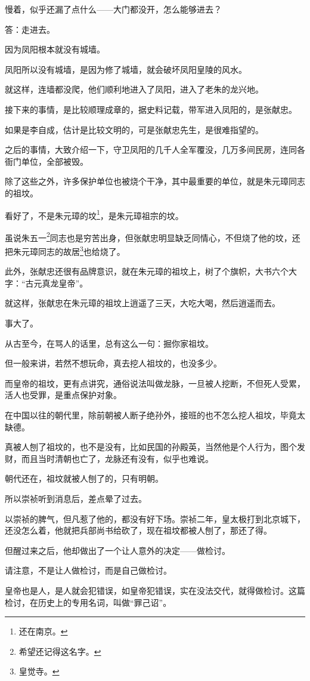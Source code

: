\begin{multicols}{\theparacolNo}
慢着，似乎还漏了点什么——大门都没开，怎么能够进去？

答：走进去。

因为凤阳根本就没有城墙。

凤阳所以没有城墙，是因为修了城墙，就会破坏凤阳皇陵的风水。

就这样，连墙都没爬，他们顺利地进入了凤阳，进入了老朱的龙兴地。

接下来的事情，是比较顺理成章的，据史料记载，带军进入凤阳的，是张献忠。

如果是李自成，估计是比较文明的，可是张献忠先生，是很难指望的。

之后的事情，大致介绍一下，守卫凤阳的几千人全军覆没，几万多间民房，连同各衙门单位，全部被毁。

除了这些之外，许多保护单位也被烧个干净，其中最重要的单位，就是朱元璋同志的祖坟。

看好了，不是朱元璋的坟\footnote{还在南京。}，是朱元璋祖宗的坟。

虽说朱五一\footnote{希望还记得这名字。}同志也是穷苦出身，但张献忠明显缺乏同情心，不但烧了他的坟，还把朱元璋同志的故居\footnote{皇觉寺。}也给烧了。

此外，张献忠还很有品牌意识，就在朱元璋的祖坟上，树了个旗帜，大书六个大字：“古元真龙皇帝”。

就这样，张献忠在朱元璋的祖坟上逍遥了三天，大吃大喝，然后逍遥而去。

事大了。

从古至今，在骂人的话里，总有这么一句：掘你家祖坟。

但一般来讲，若然不想玩命，真去挖人祖坟的，也没多少。

而皇帝的祖坟，更有点讲究，通俗说法叫做龙脉，一旦被人挖断，不但死人受累，活人也受罪，是重点保护对象。

在中国以往的朝代里，除前朝被人断子绝孙外，接班的也不怎么挖人祖坟，毕竟太缺德。

真被人刨了祖坟的，也不是没有，比如民国的孙殿英，当然他是个人行为，图个发财，而且当时清朝也亡了，龙脉还有没有，似乎也难说。

朝代还在，祖坟就被人刨了的，只有明朝。

所以崇祯听到消息后，差点晕了过去。

以崇祯的脾气，但凡惹了他的，都没有好下场。崇祯二年，皇太极打到北京城下，还没怎么着，他就把兵部尚书给砍了，现在祖坟都被人刨了，那还了得。

但醒过来之后，他却做出了一个让人意外的决定——做检讨。

请注意，不是让人做检讨，而是自己做检讨。

皇帝也是人，是人就会犯错误，如皇帝犯错误，实在没法交代，就得做检讨。这篇检讨，在历史上的专用名词，叫做“罪己诏”。


\end{multicols}
